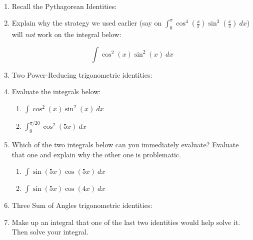\documentclass[11pt,fleqn]{article}
\begin{document}
\renewcommand{\headrulewidth}{0pt}
\newcommand{\blank}[1]{\rule{#1}{0.75pt}}
\newcommand{\bc}{\begin{center}}
\newcommand{\ec}{\end{center}}
\renewcommand{\d}{\displaystyle}

\vspace*{-0.7in}

\begin{center}
  \large
  \\
   
\end{center}

\begin{enumerate}
\item Recall the Pythagorean Identities:
\vspace{0.5in}
\item Explain why the strategy we used earlier (say on $\displaystyle\int_0^{\pi} \cos^4\left(\frac{x}{\pi}\right) \sin^3\left(\frac{x}{\pi}\right)\: dx$) will \emph{not} work on the integral below:

$$\displaystyle\int \cos^2(x) \sin^2(x)\: dx$$

\vspace{1in}
\item Two Power-Reducing trigonometric identities:
\vspace{1.5in}
\item Evaluate the integrals below:
	\begin{enumerate}
	\item $\displaystyle\int \cos^2(x) \sin^2(x)\: dx$
	\vfill
	\item $\displaystyle\int_0^{\pi/20} \cos^2(5x)\: dx$
	\vspace{1in}
	\end{enumerate}


\newpage
\item Which of the two integrals below can you immediately evaluate? Evaluate that one and explain why the other one is problematic.

	\begin{enumerate}
	\item $\displaystyle{\int \sin(5x) \cos(5x)\: dx}$
	\vfill
	\item $\displaystyle{\int \sin(5x) \cos(4x)\: dx}$
	\vfill
	\end{enumerate}
\item Three Sum of Angles trigonometric identities:
\vspace{1.5in}
\item Make up an integral that one of the last two identities would help solve it. Then solve your integral.
\vfill



\end{enumerate}
\end{document}
